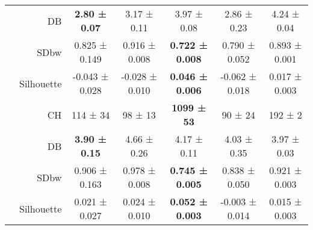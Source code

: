 \begin{tabularx}{\linewidth}{X r *{5}{c}}
 & DB & {\cellcolor[HTML]{75C477}} \color[HTML]{000000} \bfseries 2.80 \mdseries ± 0.07 & {\cellcolor[HTML]{A2D99C}} \color[HTML]{000000} 3.17 \mdseries ± 0.11 & {\cellcolor[HTML]{E9F7E5}} \color[HTML]{000000} 3.97 \mdseries ± 0.08 & {\cellcolor[HTML]{7CC87C}} \color[HTML]{000000} 2.86 \mdseries ± 0.23 & {\cellcolor[HTML]{F7FCF5}} \color[HTML]{000000} 4.24 \mdseries ± 0.04 \\
 & SDbw & {\cellcolor[HTML]{CBEBC5}} \color[HTML]{000000} 0.825 \mdseries ± 0.149 & {\cellcolor[HTML]{F7FCF5}} \color[HTML]{000000} 0.916 \mdseries ± 0.008 & {\cellcolor[HTML]{75C477}} \color[HTML]{000000} \bfseries 0.722 \mdseries ± 0.008 & {\cellcolor[HTML]{B0DFAA}} \color[HTML]{000000} 0.790 \mdseries ± 0.052 & {\cellcolor[HTML]{EFF9EC}} \color[HTML]{000000} 0.893 \mdseries ± 0.001 \\
\hhline{-------}
\multirow[c]{4}{*}{2} & Silhouette & {\cellcolor[HTML]{EBF7E7}} \color[HTML]{000000} -0.043 \mdseries ± 0.028 & {\cellcolor[HTML]{DDF2D8}} \color[HTML]{000000} -0.028 \mdseries ± 0.010 & {\cellcolor[HTML]{73C476}} \color[HTML]{000000} \bfseries 0.046 \mdseries ± 0.006 & {\cellcolor[HTML]{F7FCF5}} \color[HTML]{000000} -0.062 \mdseries ± 0.018 & {\cellcolor[HTML]{A3DA9D}} \color[HTML]{000000} 0.017 \mdseries ± 0.003 \\
 & CH & {\cellcolor[HTML]{F5FBF3}} \color[HTML]{000000} 114 \mdseries ± 34 & {\cellcolor[HTML]{F7FCF5}} \color[HTML]{000000} 98 \mdseries ± 13 & {\cellcolor[HTML]{75C477}} \color[HTML]{000000} \bfseries 1099 \mdseries ± 53 & {\cellcolor[HTML]{F7FCF5}} \color[HTML]{000000} 90 \mdseries ± 24 & {\cellcolor[HTML]{F0F9ED}} \color[HTML]{000000} 192 \mdseries ± 2 \\
 & DB & {\cellcolor[HTML]{75C477}} \color[HTML]{000000} \bfseries 3.90 \mdseries ± 0.15 & {\cellcolor[HTML]{F7FCF5}} \color[HTML]{000000} 4.66 \mdseries ± 0.26 & {\cellcolor[HTML]{B2E0AC}} \color[HTML]{000000} 4.17 \mdseries ± 0.11 & {\cellcolor[HTML]{94D390}} \color[HTML]{000000} 4.03 \mdseries ± 0.35 & {\cellcolor[HTML]{86CC85}} \color[HTML]{000000} 3.97 \mdseries ± 0.03 \\
 & SDbw & {\cellcolor[HTML]{DEF2D9}} \color[HTML]{000000} 0.906 \mdseries ± 0.163 & {\cellcolor[HTML]{F7FCF5}} \color[HTML]{000000} 0.978 \mdseries ± 0.008 & {\cellcolor[HTML]{75C477}} \color[HTML]{000000} \bfseries 0.745 \mdseries ± 0.005 & {\cellcolor[HTML]{B7E2B1}} \color[HTML]{000000} 0.838 \mdseries ± 0.050 & {\cellcolor[HTML]{E5F5E1}} \color[HTML]{000000} 0.921 \mdseries ± 0.003 \\
\hhline{-------}
\multirow[c]{4}{*}{3} & Silhouette & {\cellcolor[HTML]{CFECC9}} \color[HTML]{000000} 0.021 \mdseries ± 0.027 & {\cellcolor[HTML]{C8E9C1}} \color[HTML]{000000} 0.024 \mdseries ± 0.010 & {\cellcolor[HTML]{73C476}} \color[HTML]{000000} \bfseries 0.052 \mdseries ± 0.003 & {\cellcolor[HTML]{F7FCF5}} \color[HTML]{000000} -0.003 \mdseries ± 0.014 & {\cellcolor[HTML]{DBF1D6}} \color[HTML]{000000} 0.015 \mdseries ± 0.003 \\

\end{tabularx}
